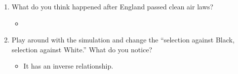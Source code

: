 \documentclass{article}
\begin{document}
\begin{enumerate}
  \begin{itemize}
    \item
  \end{itemize}
  \item What do you think happened after England passed clean air laws?
  \begin{itemize}
    \item
  \end{itemize}
  \item Play around with the simulation and change the ``selection against Black, selection against White.'' What do you notice?
  \begin{itemize}
    \item It has an inverse relationship.
  \end{itemize}
\end{enumerate}
\end{document}
